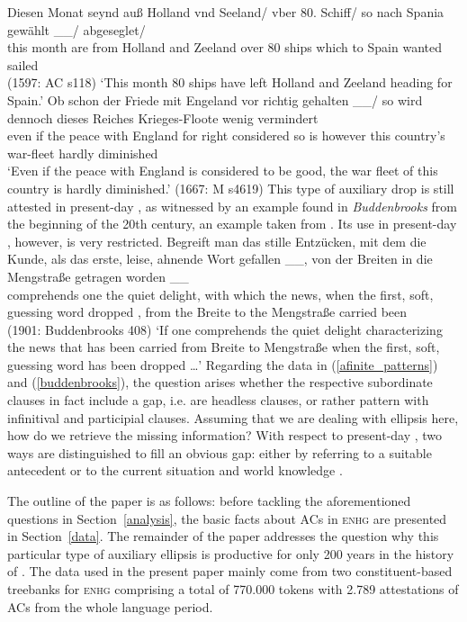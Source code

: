 \documentclass[output=paper,colorlinks,citecolor=brown]{langscibook}
\begin{document}
\eal \label{afinite_patterns}
\ex \label{rc_intro}
\gll Diesen Monat seynd auß Holland vnd Seeland/ vber 80. Schiff/ so nach Spania gewählt \_\_/ abgeseglet/  \\ this month are from Holland and Zeeland over 80 ships which to Spain wanted {} sailed \\ \hfill (1597: AC s118)
\glt `This month 80 ships have left Holland and Zeeland heading for Spain.'
\ex \label{ac_intro}
\gll Ob schon der Friede mit Engeland vor richtig gehalten  \_\_/ so wird dennoch dieses Reiches Krieges-Floote wenig vermindert \\ even if the peace with England for right considered {}  so is however this country's war-fleet hardly diminished  \\ 
\glt `Even if the peace with England is considered to be good, the war fleet of this country is hardly diminished.' \hfill (1667: M s4619)
\zl
This type of auxiliary drop is still attested in present-day , as witnessed by an example found in \textit{Buddenbrooks} from the beginning of the 20th century, an example taken from \citet{schroeder85}. Its use in present-day , however, is very restricted.
\ea \label{buddenbrooks}
\gll Begreift man das stille Entzücken, mit dem die Kunde, als das erste, leise, ahnende Wort gefallen \_\_, von der Breiten in die Mengstraße getragen worden \_\_ \\ comprehends one the quiet delight, with which the news, when the first, soft, guessing word dropped {}, from the Breite to the Mengstraße carried been    \\ \hfill (1901: Buddenbrooks 408)
\glt `If one comprehends the quiet delight characterizing the news that has been carried from Breite to Mengstraße when the first, soft, guessing word has been dropped \dots'
\z
Regarding the data in (\ref{afinite_patterns}) and (\ref{buddenbrooks}), the question arises whether the respective subordinate clauses in fact include a gap, i.e. are headless clauses, or rather pattern with infinitival and participial clauses. Assuming that we are dealing with ellipsis here, how do we retrieve the missing information? With respect to present-day , two ways are distinguished to fill an obvious gap: either by referring to a suitable antecedent or to the current situation and world knowledge \citep{reich2011}.

The outline of the paper is as follows: before tackling the aforementioned questions in Section~\ref{analysis}, the basic facts about ACs in \textsc{enhg} are presented in Section~\ref{data}. The remainder of the paper addresses the question why this particular type of auxiliary ellipsis is productive for only 200 years in the history of . The data used in the present paper mainly come from two constituent-based treebanks for \textsc{enhg} comprising a total of 770.000 tokens with 2.789 attestations of ACs from the whole language period. 
\end{document}
